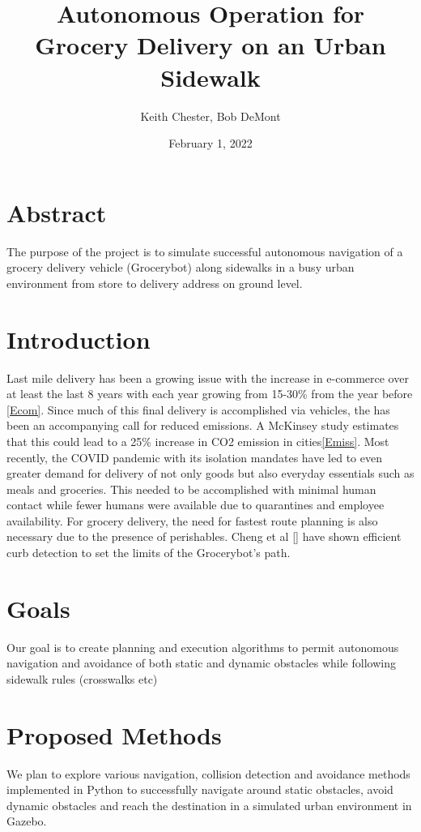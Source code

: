 \documentclass{article}
\title{Autonomous Operation for Grocery Delivery on an Urban Sidewalk }
\author{Keith Chester, Bob DeMont}
\date{February 1, 2022}
\begin{document}
\maketitle


\begin{multicols}{2}
\section*{Abstract}
The purpose of the project is to simulate successful autonomous navigation of a grocery delivery vehicle (Grocerybot) along sidewalks in a busy urban environment from store to delivery address on ground level.

\section*{Introduction}
Last mile delivery has been a growing issue with the increase in e-commerce over at least the last 8 years with each year growing from 15-30\% from the year before \ref{Ecom}.  Since much of this final delivery is accomplished via vehicles, the has been an accompanying call for reduced emissions.  A McKinsey study estimates that this could lead to a 25\% increase in CO2 emission in cities\ref{Emiss}.  Most recently, the COVID pandemic with its isolation mandates have led to even greater demand for delivery of not only goods but also everyday essentials such as meals and groceries.  This needed to be accomplished with minimal human contact while fewer humans were available due to quarantines and employee availability.  For grocery delivery, the need for fastest route planning is also necessary due to the presence of perishables.
Cheng et al \ref{} have shown efficient curb detection to set the limits of the Grocerybot's path.

\section*{Goals}
Our goal is to create planning and execution algorithms to permit autonomous navigation and avoidance of both static and dynamic obstacles while following sidewalk rules (crosswalks etc)

\section*{Proposed Methods}
We plan to explore various navigation, collision detection and avoidance methods implemented in Python to successfully navigate around static obstacles, avoid dynamic obstacles  and reach the destination in a simulated urban environment in Gazebo.


\end{multicols}
\end{document}
